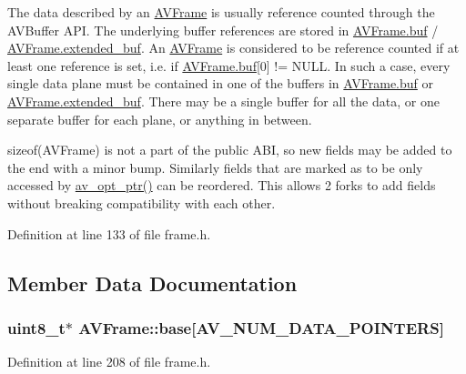 The data described by an \hyperlink{struct_a_v_frame}{A\+V\+Frame} is usually reference counted through the A\+V\+Buffer A\+PI. The underlying buffer references are stored in \hyperlink{struct_a_v_frame_a4a64d05cc676bfa8e18bf22d16c8a51f}{A\+V\+Frame.\+buf} / \hyperlink{struct_a_v_frame_a254a144d113ceedc003ec1547cc5bd54}{A\+V\+Frame.\+extended\+\_\+buf}. An \hyperlink{struct_a_v_frame}{A\+V\+Frame} is considered to be reference counted if at least one reference is set, i.\+e. if \hyperlink{struct_a_v_frame_a4a64d05cc676bfa8e18bf22d16c8a51f}{A\+V\+Frame.\+buf}\mbox{[}0\mbox{]} != N\+U\+LL. In such a case, every single data plane must be contained in one of the buffers in \hyperlink{struct_a_v_frame_a4a64d05cc676bfa8e18bf22d16c8a51f}{A\+V\+Frame.\+buf} or \hyperlink{struct_a_v_frame_a254a144d113ceedc003ec1547cc5bd54}{A\+V\+Frame.\+extended\+\_\+buf}. There may be a single buffer for all the data, or one separate buffer for each plane, or anything in between.

sizeof(\+A\+V\+Frame) is not a part of the public A\+BI, so new fields may be added to the end with a minor bump. Similarly fields that are marked as to be only accessed by \hyperlink{group__avoptions_gab1d208d09e487741a28016919225bef6}{av\+\_\+opt\+\_\+ptr()} can be reordered. This allows 2 forks to add fields without breaking compatibility with each other. 

Definition at line 133 of file frame.\+h.



\subsection{Member Data Documentation}
\subsubsection[{\texorpdfstring{base}{base}}]{ {\bf uint8\+\_\+t}$\ast$ A\+V\+Frame\+::base\mbox{[}{\bf A\+V\+\_\+\+N\+U\+M\+\_\+\+D\+A\+T\+A\+\_\+\+P\+O\+I\+N\+T\+E\+RS}\mbox{]}}\hypertarget{struct_a_v_frame_a3576f52c558b95adc4a83bf8feb7c8e4}{}\label{struct_a_v_frame_a3576f52c558b95adc4a83bf8feb7c8e4}


Definition at line 208 of file frame.\+h.

